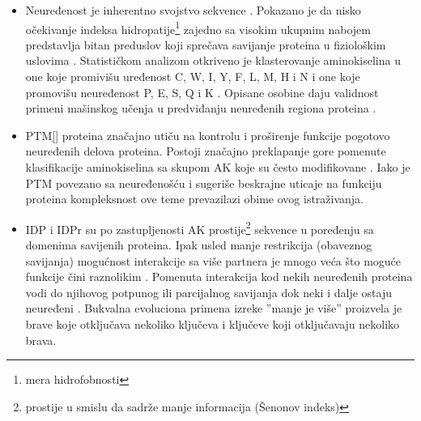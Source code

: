 \begin{itemize}

  \item
    Neuređenost je inherentno svojstvo sekvence \parencite{dunker2001}.
    Pokazano je da nisko očekivanje indeksa hidropatije\footnote{mera hidrofobnosti} zajedno sa visokim
    ukupnim nabojem predstavlja bitan preduslov koji sprečava savijanje
    proteina u fiziološkim uslovima \parencite{uversky2016}. Statističkom
    analizom otkriveno je klasterovanje aminokiselina u one koje promivišu
    uređenost C, W, I, Y, F, L, M, H i N  i one koje
    promovišu neuređenost P, E, S, Q i K .
    \parencite{oldfield2014, uversky2016} Opisane osobine daju validnost
    primeni mašinskog učenja u predviđanju neuređenih regiona proteina
    \parencite{oldfield2014}.

  \item
    PTM\ref{} proteina značajno utiču na  kontrolu i proširenje funkcije pogotovo
    neuređenih delova proteina. Postoji značajno preklapanje gore pomenute
    klasifikacije aminokiselina sa skupom AK koje su često modifikovane
    \parencite{uversky2016}. Iako je PTM povezano sa neuređenošću i sugeriše
    beskrajne uticaje na funkciju proteina \parencite{uversky2016} kompleksnost
    ove teme prevazilazi obime ovog istraživanja.

  \item
    IDP i IDPr su po zastupljenosti AK prostije\footnote{ prostije u smislu da
    sadrže manje informacija (Šenonov indeks)} sekvence u poređenju sa domenima
    savijenih proteina. Ipak usled manje restrikcija (obaveznog savijanja)
    mogućnost interakcije sa više partnera je mnogo veća što moguće funkcije
    čini raznolikim \parencite{uversky2016}.  Pomenuta interakcija kod nekih
    neuređenih proteina vodi do njihovog potpunog ili parcijalnog savijanja dok
    neki i dalje ostaju neuređeni \parencite{uversky2016}.  Bukvalna evoluciona
    primena izreke ''manje je više'' proizvela je brave koje otključava
    nekoliko ključeva i ključeve koji otključavaju nekoliko brava.


\end{itemize}
